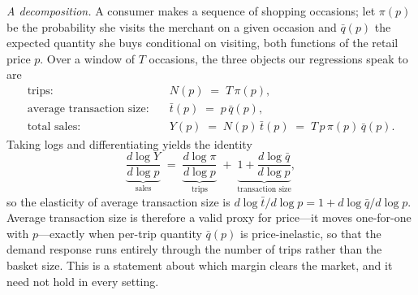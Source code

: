 \documentclass[main.tex]{subfiles}
\begin{document}
\emph{A decomposition.} A consumer makes a sequence of shopping occasions; let $\pi(p)$ be the probability she visits the merchant on a given occasion and $\bar{q}(p)$ the expected quantity she buys conditional on visiting, both functions of the retail price $p$.
Over a window of $T$ occasions, the three objects our regressions speak to are
\begin{align}
\text{trips:} \quad & N(p) \;=\; T\,\pi(p), \\
\text{average transaction size:} \quad & \bar{t}(p) \;=\; p\,\bar{q}(p), \\
\text{total sales:} \quad & Y(p) \;=\; N(p)\,\bar{t}(p) \;=\; T\,p\,\pi(p)\,\bar{q}(p).
\end{align}
Taking logs and differentiating yields the identity
\begin{equation}
\underbrace{\frac{d \log Y}{d \log p}}_{\text{sales}}
\;=\; \underbrace{\frac{d \log \pi}{d \log p}}_{\text{trips}}
\;+\; \underbrace{1 + \frac{d \log \bar{q}}{d \log p}}_{\text{transaction size}},
\end{equation}
so the elasticity of average transaction size is $d \log \bar{t} / d \log p = 1 + d \log \bar{q} / d \log p$.
Average transaction size is therefore a valid proxy for price---it moves one-for-one with $p$---exactly when per-trip quantity $\bar{q}(p)$ is price-inelastic, so that the demand response runs entirely through the number of trips rather than the basket size.
This is a statement about which margin clears the market, and it need not hold in every setting.
\end{document}
